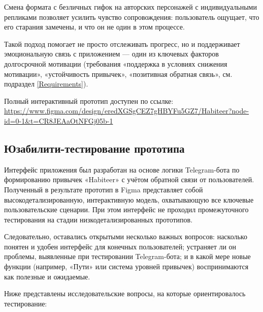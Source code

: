 \documentclass[pdflatex,sn-mathphys-num]{sn-jnl}%
\theoremstyle{thmstyleone}%
\theoremstyle{thmstyletwo}%
\theoremstyle{thmstylethree}%
\begin{document}
Смена формата с безличных гифок на авторских персонажей с индивидуальными репликами позволяет усилить чувство сопровождения: пользователь ощущает, что его старания замечены, и что он не один в этом процессе.

Такой подход помогает не просто отслеживать прогресс, но и поддерживает эмоциональную связь с приложением — один из ключевых факторов долгосрочной мотивации (требования «поддержка в условиях снижения мотивации», «устойчивость привычек», «позитивная обратная связь», см. подраздел \ref{Requirements}).

\medskip

\noindent Полный интерактивный прототип доступен по ссылке:
\url{https://www.figma.com/design/eredXGSgCEZ7gHBYFu5GZ7/Habiteer?node-id=0-1&t=CR8JEAaOtNFGj05b-1}

\subsection{Юзабилити-тестирование прототипа}

Интерфейс приложения был разработан на основе логики Telegram-бота по формированию привычек «Habiteer» с учётом обратной связи от пользователей. Полученный в результате прототип в Figma представляет собой высокодетализированную, интерактивную модель, охватывающую все ключевые пользовательские сценарии. При этом интерфейс не проходил промежуточного тестирования на стадии низкодетализированных прототипов.

Следовательно, оставались открытыми несколько важных вопросов: насколько понятен и удобен интерфейс для конечных пользователей; устраняет ли он проблемы, выявленные при тестировании Telegram-бота; и в какой мере новые функции (например, «Пути» или система уровней привычек) воспринимаются как полезные и ожидаемые.

Ниже представлены исследовательские вопросы, на которые ориентировалось тестирование:
\end{document}

